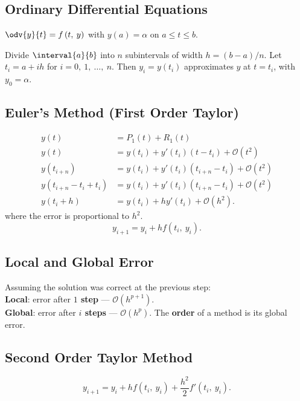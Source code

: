 \documentclass{article}
\begin{document}
\begin{multicols}{3}
    \section{Ordinary Differential Equations}
    \(\odv{y}{t} = f\left( t,\: y \right)\) with \(y\left( a \right) = \alpha\) on \(a \leq t \leq b\).

    Divide \(\interval{a}{b}\) into \(n\) subintervals of width \(h = \left( b - a \right) / n\).
    Let \(t_i = a + i h\) for \(i = 0,\: 1,\: \ldots,\: n\).
    Then \(y_i = y\left( t_i \right)\) approximates \(y\) at \(t = t_i\), with \(y_0 = \alpha\).
    \subsection{Euler's Method (First Order Taylor)}
    {\scriptsize
    \begin{align*}
        y(t) &= P_1(t) + R_1(t) \\
        y(t) &= y(t_i) + y'(t_i)(t-t_i) + \mathcal{O}(t^2) \\
        y(t_{i+n}) &= y(t_i) + y'(t_i)(t_{i+n}-t_i) + \mathcal{O}(t^2) \\
        y(t_{i+n}-t_i+t_i) &= y(t_i) + y'(t_i)(t_{i+n}-t_i) + \mathcal{O}(t^2) \\
        y\left( t_i + h \right) &= y\left( t_i \right) + h y'\left( t_i \right) + \mathcal{O}\left( h^2 \right).
    \end{align*}}
    where the error is proportional to \(h^2\).
    \begin{equation*}
        y_{i + 1} = y_i + h f\left( t_i,\: y_i \right).
    \end{equation*}
    \subsection{Local and Global Error}
    Assuming the solution was correct at the previous step: \\
    \textbf{Local}: error after \textbf{\(1\) step} --- \(\mathcal{O}\left( h^{p + 1} \right)\). \\
    \textbf{Global}: error after \textbf{\(i\) steps} --- \(\mathcal{O}\left( h^p \right)\).
    The \textbf{order} of a method is its global error.
    \subsection{Second Order Taylor Method}
    \begin{equation*}
        y_{i + 1} = y_i + h f\left( t_i,\: y_i \right) + \frac{h^2}{2} f'\left( t_i,\: y_i \right).
    \end{equation*}

\end{multicols}
\end{document}
